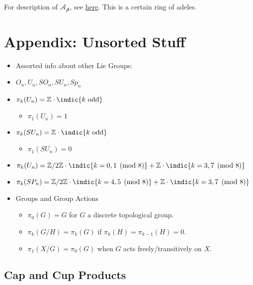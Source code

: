 For description of \(\mathcal{A_p}\), see
\href{http://math.jhu.edu/~jmb/note/torext.pdf}{here}. This is a certain
ring of adeles.

\hypertarget{appendix-unsorted-stuff}{%
\section{Appendix: Unsorted Stuff}\label{appendix-unsorted-stuff}}

\begin{itemize}
\item
  Assorted info about other Lie Groups:
\item
  \(O_n, U_n, SO_n, SU_n, Sp_n\)
\item
  \(\pi_k(U_n) = {\mathbb{Z}}\cdot\indic{k~\text{odd}}\)

  \begin{itemize}
  \tightlist
  \item
    \(\pi_1(U_n) = 1\)
  \end{itemize}
\item
  \(\pi_k(SU_n) = {\mathbb{Z}}\cdot\indic{k~\text{odd}}\)

  \begin{itemize}
  \tightlist
  \item
    \(\pi_1(SU_n) = 0\)
  \end{itemize}
\item
  \(\pi_k(U_n) = {\mathbb{Z}}/2{\mathbb{Z}}\cdot\indic{k = 0,1\pmod 8} + {\mathbb{Z}}\cdot\indic{k = 3,7 \pmod 8}\)
\item
  \(\pi_k(SP_n) = {\mathbb{Z}}/2{\mathbb{Z}}\cdot\indic{k = 4,5\pmod 8} + {\mathbb{Z}}\cdot\indic{k = 3,7 \pmod 8}\)
\item
  Groups and Group Actions

  \begin{itemize}
  \tightlist
  \item
    \(\pi_0(G) = G\) for \(G\) a discrete topological group.
  \item
    \(\pi_k(G/H) = \pi_k(G)\) if \(\pi_k(H) = \pi_{k-1}(H) = 0\).
  \item
    \(\pi_1(X/G) = \pi_0(G)\) when \(G\) acts freely/transitively on
    \(X\).
  \end{itemize}
\end{itemize}

\hypertarget{cap-and-cup-products}{%
\subsection{Cap and Cup Products}\label{cap-and-cup-products}}

